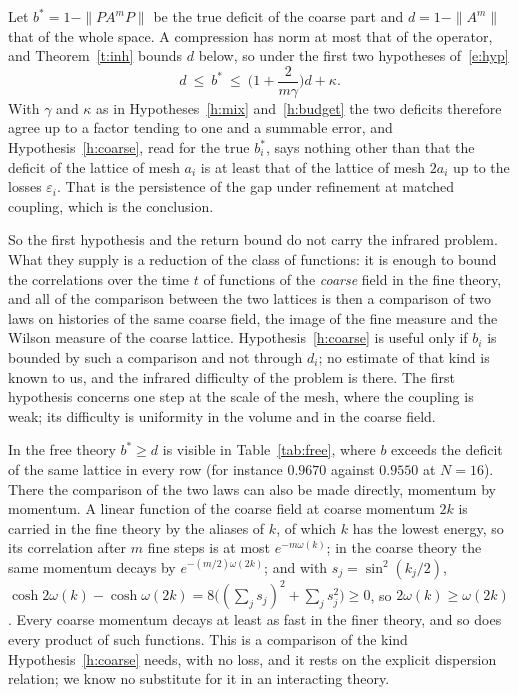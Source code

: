 \begin{remark}\label{r:where}
Let $b^*=1-\|PA^mP\|$ be the true deficit of the coarse part and $d=1-\|A^m\|$ that of the whole space. A
compression has norm at most that of the operator, and Theorem~\ref{t:inh} bounds $d$ below, so under the
first two hypotheses of~\eqref{e:hyp}
\[
d\ \le\ b^*\ \le\ \Big(1+\frac2{m\gamma}\Big)d+\kappa .
\]
With $\gamma$ and $\kappa$ as in Hypotheses~\ref{h:mix} and~\ref{h:budget} the two deficits therefore agree up
to a factor tending to one and a summable error, and Hypothesis~\ref{h:coarse}, read for the true $b^*_i$,
says nothing other than that the deficit of the lattice of mesh $a_i$ is at least that of the lattice of
mesh $2a_i$ up to the losses $\varepsilon_i$. That is the persistence of the gap under refinement at matched
coupling, which is the conclusion.

So the first hypothesis and the return bound do not carry the infrared
problem. What they supply is a reduction of the class of functions: it is enough to bound the correlations
over the time $t$ of functions of the \emph{coarse} field in the fine theory, and all of the comparison
between the two lattices is then a comparison of two laws on histories of the same coarse field, the image
of the fine measure and the Wilson measure of the coarse lattice. Hypothesis~\ref{h:coarse} is useful only if
$b_i$ is bounded by such a comparison and not through $d_i$; no estimate of that kind is known to us, and
the infrared difficulty of the problem is there. The first hypothesis concerns one step at the scale of the
mesh, where the coupling is weak; its difficulty is uniformity in the volume and in the coarse field.

In the free theory $b^*\ge d$ is visible in Table~\ref{tab:free}, where $b$ exceeds the deficit of the same
lattice in every row (for instance $0.9670$ against $0.9550$ at $N=16$). There the comparison of the two laws
can also be made directly, momentum by momentum. A linear function of the coarse field at coarse momentum
$2k$ is carried in the fine theory by the aliases of $k$, of which $k$ has the lowest energy, so its
correlation after $m$ fine steps is at most $e^{-m\omega(k)}$; in the coarse theory the same momentum decays
by $e^{-(m/2)\omega(2k)}$; and with $s_j=\sin^2(k_j/2)$,
$\cosh2\omega(k)-\cosh\omega(2k)=8\big((\sum_js_j)^2+\sum_js_j^2\big)\ge0$, so $2\omega(k)\ge\omega(2k)$. Every
coarse momentum decays at least as fast in the finer theory, and so does every product of such functions.
This is a comparison of the kind Hypothesis~\ref{h:coarse} needs, with no loss, and it rests on the explicit
dispersion relation; we know no substitute for it in an interacting theory.
\end{remark}


